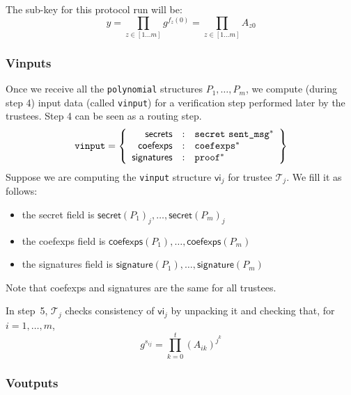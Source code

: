 \documentclass[a4paper]{article}
\begin{document}
The sub-key for this protocol run will be:
\[
y=\prod_{z\in[1\dots m]}g^{f_z(0)}=\prod_{z\in[1\dots m]}A_{z0}
\]

\subsubsection{Vinputs}
\label{vinputs}

Once we receive all the \texttt{polynomial} structures
$P_1,\dotsc,P_m$, we compute (during step 4) input data (called
\texttt{vinput}) for a verification step performed later by the
trustees. Step 4 can be seen as a routing step.
\begin{gather*}
  \texttt{vinput}=\left\{
    \begin{array}{rcl}
      \textsf{secrets}&:&\texttt{secret}\ \texttt{sent\_msg}^\ast\\
      \textsf{coefexps}&:&\texttt{coefexps}^\ast\\
      \textsf{signatures}&:&\proof^\ast
    \end{array}
  \right\}
\end{gather*}
Suppose we are computing the \texttt{vinput} structure $\textsf{vi}_j$
for trustee $\mathcal{T}_j$. We fill it as follows:
\begin{itemize}
\item the \textsf{secret} field is
  $\textsf{secret}(P_1)_j,\dotsc,\textsf{secret}(P_m)_j$
\item the \textsf{coefexps} field is
  $\textsf{coefexps}(P_1),\dotsc,\textsf{coefexps}(P_m)$
\item the \textsf{signatures} field is
  $\textsf{signature}(P_1),\dotsc,\textsf{signature}(P_m)$
\end{itemize}
Note that \textsf{coefexps} and \textsf{signatures} are the same for
all trustees.

In step~5, $\mathcal{T}_j$ checks consistency of $\textsf{vi}_j$ by unpacking it
and checking that, for $i=1,\dotsc,m$,
\[
g^{s_{ij}}=\prod_{k=0}^t(A_{ik})^{j^k}
\]

\subsubsection{Voutputs}
\label{voutputs}
\end{document}
